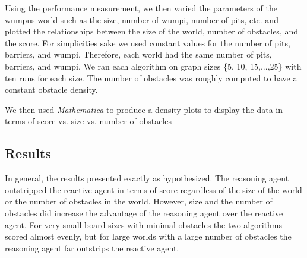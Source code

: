 \documentclass{article}
\begin{document}
	Using the performance measurement, we then varied the parameters of the wumpus world such as the size, number of wumpi, number of pits, etc. and plotted the relationships between the size of the world, number of obstacles, and the score.
	 For simplicities sake we used constant values for the number of pits, barriers, and wumpi.
	  Therefore, each world had the same number of pits, barriers, and wumpi. 
	  We ran each algorithm on graph sizes \{5, 10, 15,...,25\} with ten runs for each size.
	  The number of obstacles was roughly computed to have a constant obstacle density.
	
	We then used \textit{Mathematica}  to produce a density plots to display the data in terms of score vs. size vs. number of obstacles
	
	\subsection{Results}
		In general, the results presented exactly as hypothesized. The reasoning agent outstripped the reactive agent in terms of score regardless of the size of the world or the number of obstacles in the world. 
		However, size and the number of obstacles did increase the advantage of the reasoning agent over the reactive agent.
		For very small board sizes with minimal obstacles the two algorithms scored almost evenly, but for large worlds with a  large number of obstacles the reasoning agent far outstrips the reactive agent.
		
\end{document}
